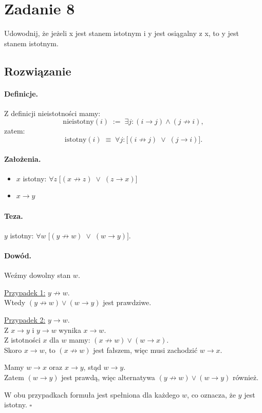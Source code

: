 \section{Zadanie 8}
Udowodnij, że jeżeli x jest stanem istotnym i y jest osiągalny z x, to y jest stanem istotnym.

\subsection*{Rozwiązanie}
\paragraph{Definicje.}

Z definicji nieistotności mamy:
\[
	\text{nieistotny}(i) \;:=\; \exists j : (i \to j) \land (j \not\to i),
\]
zatem:
\[
	\text{istotny}(i) \;\equiv\; \forall j : \big[ (i \not\to j) \;\lor\; (j \to i) \big].
\]

\paragraph{Założenia.}
\begin{itemize}
	\item \(x\) istotny: \(\forall z \; \big[ (x \not\to z) \;\lor\; (z \to x) \big]\)
	\item \(x \to y\)
\end{itemize}

\paragraph{Teza.}
\(y\) istotny: \(\forall w \; \big[ (y \not\to w) \;\lor\; (w \to y) \big]\).

\paragraph{Dowód.}
Weźmy dowolny stan \(w\).

\underline{Przypadek 1:} \(y \not\to w\). \\
Wtedy \( (y \not\to w) \lor (w \to y) \) jest prawdziwe.

\underline{Przypadek 2:} \(y \to w\). \\
Z \(x \to y\) i \(y \to w\) wynika \(x \to w\). \\
Z istotności \(x\) dla \(w\) mamy: \((x \not\to w) \lor (w \to x)\). \\
Skoro \(x \to w\), to \((x \not\to w)\) jest fałszem, więc musi zachodzić \(w \to x\).

Mamy \(w \to x\) oraz \(x \to y\), stąd \(w \to y\). \\
Zatem \((w \to y)\) jest prawdą, więc alternatywa \((y \not\to w) \lor (w \to y)\) również.

W obu przypadkach formuła jest spełniona dla każdego \(w\), co oznacza, że \(y\) jest istotny. \(\square\)